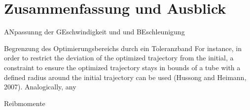 \chapter{Zusammenfassung und Ausblick}




ANpassunng der GEschwindigkeit und und BEschleunigung \cite[S.~57]{Eggers.2019}


Begrenzung des Optimierungsbereichs durch ein Toleranzband \cite[S.~55]{Eggers.2019}
For instance, in order to restrict the deviation of the optimized trajectory from the initial, a constraint to ensure the optimized trajectory stays in bounds of a tube with a defined radius around the initial trajectory can be used (Hussong and Heimann, 2007). Analogically, any


Reibmomente \cite[S.~13]{Eggers.2019}





